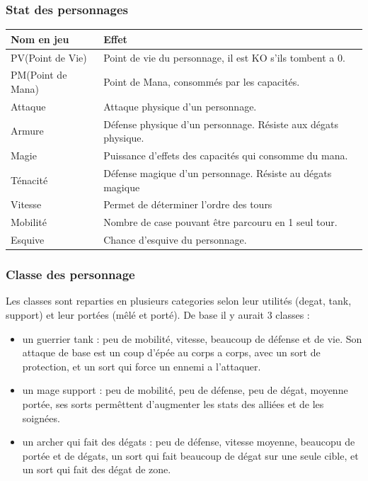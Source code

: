 \documentclass[a4paper,12pt]{article}
\begin{document}
\subsubsection{Stat des personnages}

\begin{tabular}{|l|l|}
  \hline
  Nom en jeu & Effet \\
  \hline
  \hline
  PV(Point de Vie) & Point de vie du personnage, il est KO s'ils tombent a 0.\\
  \hline
  PM(Point de Mana) & Point de Mana, consommés par les capacités. \\
  \hline
  Attaque & Attaque physique d'un personnage. \\
  \hline
  Armure & Défense physique d'un personnage. Résiste aux dégats physique.\\
  \hline 
  Magie & Puissance d'effets des capacités qui consomme du mana. \\
  \hline 
  Ténacité & Défense magique d'un personnage. Résiste au dégats magique \\
  \hline 
  Vitesse & Permet de déterminer l'ordre des tours \\
  \hline
  Mobilité & Nombre de case pouvant être parcouru en 1 seul tour. \\
  \hline
  Esquive & Chance d'esquive du personnage. \\
  \hline
\end{tabular}

\subsubsection{Classe des personnage}

Les classes sont reparties en plusieurs categories selon leur utilités (degat, tank, support) et leur portées (mêlé et porté).
De base il y aurait 3 classes : 

\begin{itemize}
    \item un guerrier tank : peu de mobilité, vitesse, beaucoup de défense et de vie. Son attaque de base est un coup d'épée au corps a corps, avec un sort de protection, et un sort qui force un ennemi a l'attaquer.
    \item un mage support : peu de mobilité, peu de défense, peu de dégat, moyenne portée, ses sorts permêttent d'augmenter les stats des alliées et de les soignées.
    \item un archer qui fait des dégats : peu de défense, vitesse moyenne, beaucopu de portée et de dégats, un sort qui fait beaucoup de dégat sur une seule cible, et un sort qui fait des dégat de zone.
\end{itemize}
\end{document}
